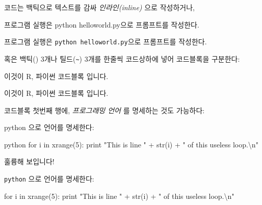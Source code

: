 \documentclass[
  letterpaper,
]{book}
\newenvironment{Shaded}{\begin{snugshade}}{\end{snugshade}}
\newcommand{\AttributeTok}[1]{\textcolor[rgb]{0.40,0.45,0.13}{#1}}
\newcommand{\BuiltInTok}[1]{\textcolor[rgb]{0.00,0.23,0.31}{#1}}
\newcommand{\CharTok}[1]{\textcolor[rgb]{0.13,0.47,0.30}{#1}}
\newcommand{\ControlFlowTok}[1]{\textcolor[rgb]{0.00,0.23,0.31}{#1}}
\newcommand{\DecValTok}[1]{\textcolor[rgb]{0.68,0.00,0.00}{#1}}
\newcommand{\FunctionTok}[1]{\textcolor[rgb]{0.28,0.35,0.67}{#1}}
\newcommand{\KeywordTok}[1]{\textcolor[rgb]{0.00,0.23,0.31}{#1}}
\newcommand{\NormalTok}[1]{\textcolor[rgb]{0.00,0.23,0.31}{#1}}
\newcommand{\OperatorTok}[1]{\textcolor[rgb]{0.37,0.37,0.37}{#1}}
\newcommand{\StringTok}[1]{\textcolor[rgb]{0.13,0.47,0.30}{#1}}
\begin{document}
코드는 백틱으로 텍스트를 감싸 \emph{인라인(inline)} 으로 작성하거나,

\begin{Shaded}
\begin{Highlighting}[]
\AttributeTok{프로그램 실행은 \textasciigrave{}python helloworld.py\textasciigrave{}으로 프롬프트를 작성한다.}
\end{Highlighting}
\end{Shaded}

프로그램 실행은 \texttt{python\ helloworld.py}으로 프롬프트를 작성한다.

혹은 백틱(\texttt{\textasciigrave{}}) 3개나
틸드(\texttt{\textasciitilde{}}) 3개를 한줄씩 코드상하에 넣어 코드블록을
구분한다:

\begin{Shaded}
\begin{Highlighting}[]
\AttributeTok{\textasciigrave{}\textasciigrave{}\textasciigrave{}}
\AttributeTok{이것이}
\AttributeTok{R, 파이썬}
\AttributeTok{코드블록 입니다.}
\AttributeTok{\textasciigrave{}\textasciigrave{}\textasciigrave{}}
\end{Highlighting}
\end{Shaded}

\begin{Shaded}
\begin{Highlighting}[]
\AttributeTok{이것이}
\AttributeTok{R, 파이썬}
\AttributeTok{코드블록 입니다.}
\end{Highlighting}
\end{Shaded}

코드블록 첫번째 행에, \emph{프로그래밍 언어} 를 명세하는 것도 가능하다:

\begin{Shaded}
\begin{Highlighting}[]
\FunctionTok{\textasciigrave{}python\textasciigrave{} 으로 언어를 명세한다}\KeywordTok{:}

\AttributeTok{\textasciigrave{}\textasciigrave{}\textasciigrave{}python}
\FunctionTok{for i in xrange(5)}\KeywordTok{:}
\AttributeTok{  print "This is line " + str(i) + " of this useless loop.\textbackslash{}n"}
\AttributeTok{\textasciigrave{}\textasciigrave{}\textasciigrave{}}

\AttributeTok{훌륭해 보입니다!}
\end{Highlighting}
\end{Shaded}

\texttt{python} 으로 언어를 명세한다:

\begin{Shaded}
\begin{Highlighting}[]
\ControlFlowTok{for}\NormalTok{ i }\KeywordTok{in} \BuiltInTok{xrange}\NormalTok{(}\DecValTok{5}\NormalTok{):}
  \BuiltInTok{print} \StringTok{"This is line "} \OperatorTok{+} \BuiltInTok{str}\NormalTok{(i) }\OperatorTok{+} \StringTok{" of this useless loop.}\CharTok{\textbackslash{}n}\StringTok{"}
\end{Highlighting}
\end{Shaded}
\end{document}
